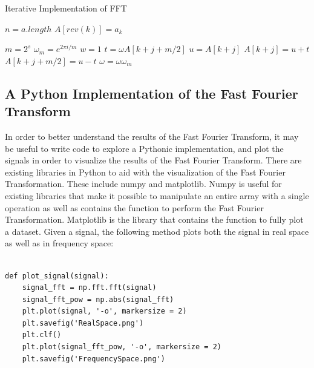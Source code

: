 \documentclass{amsproc}
\begin{document}
\begin{algorithm}
\caption{Iterative Implementation of FFT}\label{it-fft}
\begin{algorithmic}[1]

\State $n = a.length$
	\State $A[rev(k)] = a_k$ 
\EndFor

\EndProcedure


\State {}
	\State $m = 2^s$
	\State $\omega_m = e^{2 \pi i / m}$
		\State $w = 1$
			\State $t = \omega A[k + j + m/2]$
			\State $u = A[k+j]$
			\State $A[k+j] = u + t$
			\State $A[k+j+m/2] = u - t$
			\State $\omega = \omega \omega_m$
		\EndFor
	\EndFor
\EndFor

\EndProcedure

\end{algorithmic}
\end{algorithm}

\subsection{A Python Implementation of the Fast Fourier Transform}

In order to better understand the results of the Fast Fourier Transform, it may be useful to write code to explore a Pythonic implementation, and  plot the signals in order to visualize the results of the Fast Fourier Transform. There are existing libraries in Python to aid with the visualization of the Fast Fourier Transformation. These include numpy and matplotlib. Numpy is useful for existing libraries that make it possible to manipulate an entire array with a single operation as well as contains the function to perform the Fast Fourier Transformation. Matplotlib is the library that contains the function to fully plot a dataset. Given a signal, the following method plots both the signal in real space as well as in frequency space:

\begin{Verbatim}[tabsize=4]

def plot_signal(signal):
	signal_fft = np.fft.fft(signal)
	signal_fft_pow = np.abs(signal_fft)
	plt.plot(signal, '-o', markersize = 2)
	plt.savefig('RealSpace.png')
	plt.clf()
	plt.plot(signal_fft_pow, '-o', markersize = 2)
	plt.savefig('FrequencySpace.png')
	
\end{Verbatim}
\end{document}
